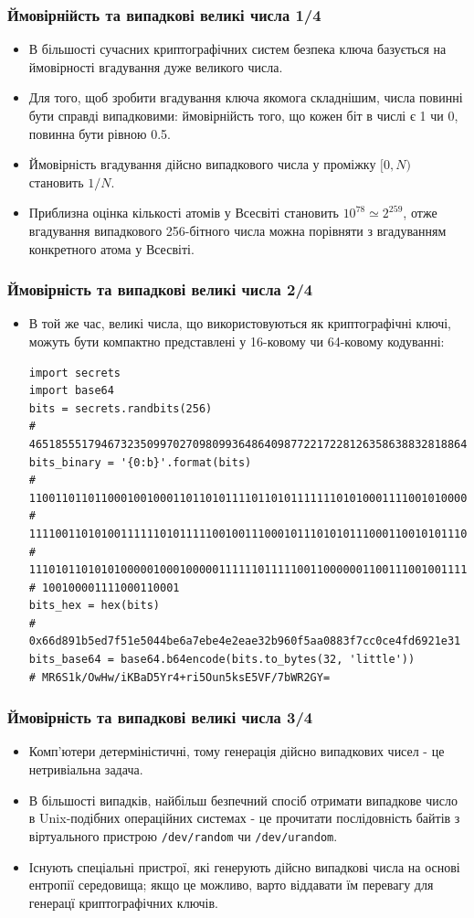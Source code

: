 \documentclass{beamer}
\begin{document}
\begin{frame}[fragile]
  \frametitle{Ймовірнійсть та випадкові великі числа 1/4}
  \begin{itemize}
  \item В більшості сучасних криптографічних систем безпека ключа базується на
    ймовірності вгадування дуже великого числа.
  \item Для того, щоб зробити вгадування ключа якомога складнішим, числа повинні
    бути справді випадковими: ймовірнійсть того, що кожен біт в числі є 1 чи 0,
    повинна бути рівною 0.5.
  \item Ймовірність вгадування дійсно випадкового числа у проміжку $[0, N)$
    становить $1/N$.
  \item Приблизна оцінка кількості атомів у Всесвіті становить
    $10^{78} \simeq 2^{259}$, отже вгадування випадкового 256-бітного числа
    можна порівняти з вгадуванням конкретного атома у Всесвіті.
  \end{itemize}
\end{frame}

\begin{frame}[fragile]
  \frametitle{Ймовірність та випадкові великі числа 2/4}
  \begin{itemize}
  \item В той же час, великі числа, що використовуються як криптографічні ключі,
    можуть бути компактно представлені у 16-ковому чи 64-ковому кодуванні:
\begin{verbatim}
import secrets
import base64
bits = secrets.randbits(256)
# 46518555179467323509970270980993648640987722172281263586388328188640792550961
bits_binary = '{0:b}'.format(bits)
# 110011011011000100100011011010111101101011111110101000111100101000001000100101\
# 111100110101001111110101111100100111000101110101011100011001010111001011000001\
# 111010110101010000010001000001111110111110011000000110011100100111111010110100\
# 100100001111000110001
bits_hex = hex(bits)
# 0x66d891b5ed7f51e5044be6a7ebe4e2eae32b960f5aa0883f7cc0ce4fd6921e31
bits_base64 = base64.b64encode(bits.to_bytes(32, 'little'))
# MR6S1k/OwHw/iKBaD5Yr4+ri5Oun5ksE5VF/7bWR2GY=
\end{verbatim}
  \end{itemize}
\end{frame}

\begin{frame}[fragile]
  \frametitle{Ймовірність та випадкові великі числа 3/4}
  \begin{itemize}
  \item Комп'ютери детерміністичні, тому генерація дійсно випадкових чисел - це
    нетривіальна задача.
  \item В більшості випадків, найбільш безпечний спосіб отримати випадкове число
    в Unix-подібних операційних системах - це прочитати послідовність байтів з
    віртуального пристрою \texttt{/dev/random} чи
    \texttt{/dev/urandom}.
  \item Існують спеціальні пристрої, які генерують дійсно випадкові числа на
    основі ентропії середовища; якщо це можливо, варто віддавати їм перевагу для
    генерацї криптографічних ключів.
  \end{itemize}
\end{frame}
\end{document}
